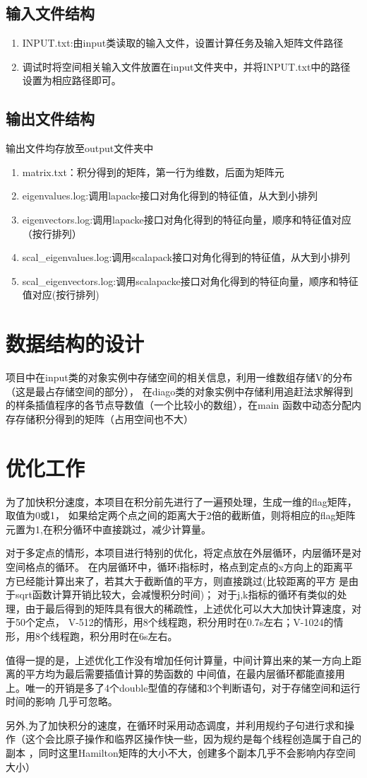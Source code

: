 \documentclass[UTF-8]{ctexart}
\begin{document}
\subsection{输入文件结构}
\begin{enumerate}
    \item INPUT.txt:由input类读取的输入文件，设置计算任务及输入矩阵文件路径
    \item 调试时将空间相关输入文件放置在input文件夹中，并将INPUT.txt中的路径
    设置为相应路径即可。
\end{enumerate}
\subsection{输出文件结构}
输出文件均存放至output文件夹中
\begin{enumerate}
    \item matrix.txt：积分得到的矩阵，第一行为维数，后面为矩阵元
    \item eigenvalues.log:调用lapacke接口对角化得到的特征值，从大到小排列
    \item eigenvectors.log:调用lapacke接口对角化得到的特征向量，顺序和特征值对应（按行排列）
    \item scal\_eigenvalues.log:调用scalapack接口对角化得到的特征值，从大到小排列
    \item scal\_eigenvectors.log:调用scalapacke接口对角化得到的特征向量，顺序和特征值对应(按行排列)
\end{enumerate}
\section{数据结构的设计}
项目中在input类的对象实例中存储空间的相关信息，利用一维数组存储V的分布（这是最占存储空间的部分），
在diago类的对象实例中存储利用追赶法求解得到的样条插值程序的各节点导数值（一个比较小的数组），在main
函数中动态分配内存存储积分得到的矩阵（占用空间也不大）
\section{优化工作}
为了加快积分速度，本项目在积分前先进行了一遍预处理，生成一维的flag矩阵，取值为0或1，
如果给定两个点之间的距离大于2倍的截断值，则将相应的flag矩阵元置为1,在积分循环中直接跳过，减少计算量。\par
对于多定点的情形，本项目进行特别的优化，将定点放在外层循环，内层循环是对空间格点的循环。
在内层循环中，循环i指标时，格点到定点的x方向上的距离平方已经能计算出来了，若其大于截断值的平方，则直接跳过(比较距离的平方
是由于sqrt函数计算开销比较大，会减慢积分时间)；
对于j,k指标的循环有类似的处理，由于最后得到的矩阵具有很大的稀疏性，上述优化可以大大加快计算速度，对于50个定点，
V-512的情形，用8个线程跑，积分用时在0.7s左右；V-1024的情形，用8个线程跑，积分用时在6s左右。\par
值得一提的是，上述优化工作没有增加任何计算量，中间计算出来的某一方向上距离的平方均为最后需要插值计算的势函数的
中间值，在最内层循环都能直接用上。唯一的开销是多了4个double型值的存储和3个判断语句，对于存储空间和运行时间的影响
几乎可忽略。\par
另外,为了加快积分的速度，在循环时采用动态调度，并利用规约子句进行求和操作（这个会比原子操作和临界区操作快一些，因为规约是每个线程创造属于自己的副本
，同时这里Hamilton矩阵的大小不大，创建多个副本几乎不会影响内存空间大小）
\end{document}
